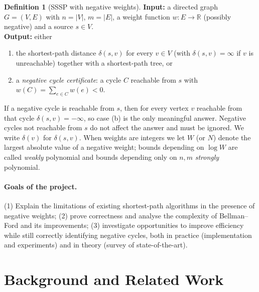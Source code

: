 \documentclass[11pt,a4paper]{article}
\theoremstyle{definition}
\newtheorem{definition}[theorem]{Definition}
\begin{document}
\begin{definition}[SSSP with negative weights]
\textbf{Input:} a directed graph $G=(V,E)$ with $n=|V|$, $m=|E|$, a weight function $w:E\to\mathbb{R}$ (possibly negative) and a source $s\in V$.\\
\textbf{Output:} either
\begin{enumerate}[label=(\alph*)]
\item the shortest-path distance $\delta(s,v)$ for every $v\in V$ (with $\delta(s,v)=\infty$ if $v$ is unreachable) together with a shortest-path tree, or
\item a \emph{negative cycle certificate}: a cycle $C$ reachable from $s$ with $w(C)=\sum_{e\in C}w(e)<0$.
\end{enumerate}
\end{definition}

If a negative cycle is reachable from $s$, then for every vertex $v$ reachable from that cycle $\delta(s,v)=-\infty$, so case (b) is the only meaningful answer. Negative cycles not reachable from $s$ do not affect the answer and must be ignored. We write $\delta(v)$ for $\delta(s,v)$. When weights are integers we let $W$ (or $N$) denote the largest absolute value of a negative weight; bounds depending on $\log W$ are called \emph{weakly} polynomial and bounds depending only on $n,m$ \emph{strongly} polynomial.

\paragraph{Goals of the project.} (1) Explain the limitations of existing shortest-path algorithms in the presence of negative weights; (2) prove correctness and analyse the complexity of Bellman--Ford and its improvements; (3) investigate opportunities to improve efficiency while still correctly identifying negative cycles, both in practice (implementation and experiments) and in theory (survey of state-of-the-art).

\section{Background and Related Work}
\end{document}
